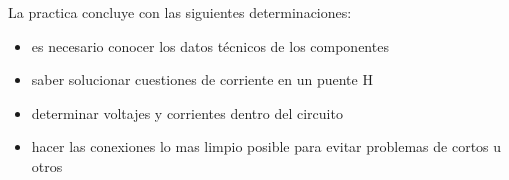\documentclass[11pt,a4paper]{article}
\begin{document}
La practica concluye con las siguientes determinaciones:
\begin{itemize}
\item es necesario conocer los datos técnicos de los componentes
\item saber solucionar cuestiones de corriente en un puente H
\item determinar voltajes y corrientes dentro del circuito
\item hacer las conexiones lo mas limpio posible para evitar problemas de cortos u otros
\end{itemize}


 

\end{document}
